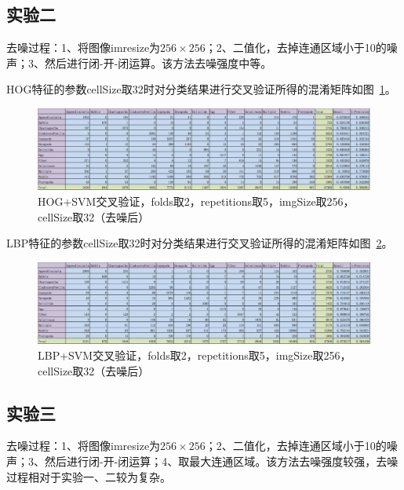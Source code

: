 \documentclass[12pt]{article}
\begin{document}
\subsection{实验二}
去噪过程：1、将图像imresize为$256 \times 256$；2、二值化，去掉连通区域小于10的噪声；3、然后进行闭-开-闭运算。该方法去噪强度中等。

HOG特征的参数cellSize取32时对分类结果进行交叉验证所得的混淆矩阵如图~\ref{fig:HOG-SVM-2-folds-5-repetitions-32-256-3}。
\begin{figure}[!ht]
\centering
\includegraphics[width=1.0\linewidth]{HOG-SVM-2-folds-5-repetitions-32-256-3}
\caption{HOG+SVM交叉验证，folds取2，repetitions取5，imgSize取256，cellSize取32（去噪后）}
\label{fig:HOG-SVM-2-folds-5-repetitions-32-256-3}
\end{figure}

LBP特征的参数cellSize取32时对分类结果进行交叉验证所得的混淆矩阵如图~\ref{fig:LBP-SVM-2-folds-5-repetitions-32-256-3}。
\begin{figure}[!ht]
\centering
\includegraphics[width=1.0\linewidth]{LBP-SVM-2-folds-5-repetitions-32-256-3}
\caption{LBP+SVM交叉验证，folds取2，repetitions取5，imgSize取256，cellSize取32（去噪后）}
\label{fig:LBP-SVM-2-folds-5-repetitions-32-256-3}
\end{figure}

\subsection{实验三}
去噪过程：1、将图像imresize为$256 \times 256$；2、二值化，去掉连通区域小于10的噪声；3、然后进行闭-开-闭运算；4、取最大连通区域。该方法去噪强度较强，去噪过程相对于实验一、二较为复杂。
\end{document}

